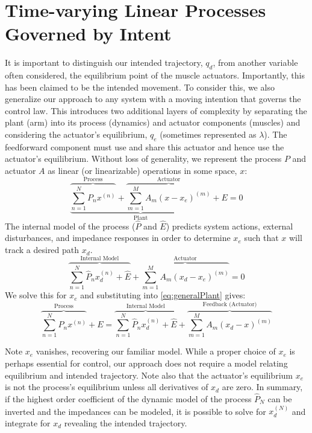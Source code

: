 \documentclass[10pt]{article}
\begin{document}
\section*{Time-varying Linear Processes Governed by Intent}
It is important to distinguish our intended trajectory, $q_d$, from another variable often considered, the equilibrium point of the muscle actuators. Importantly, this has been claimed to be the intended movement. To consider this, we also generalize our approach to any system with a moving intention that governs the control law. This introduces two additional layers of complexity by separating the plant (arm) into its process (dynamics) and actuator components (muscles) and considering the actuator's equilibrium, $q_e$ (sometimes represented as $\lambda$). The feedforward component must use and share this actuator and hence use the actuator's equilibrium. Without loss of generality, we represent the process $P$ and actuator $A$ as linear (or linearizable) operations in some space, $x$:
\begin{equation} \label{eq:generalPlant}
\underbrace{\overbrace{\sum_{n=1}^N P_nx^{(n)}}^\text{Process}+\overbrace{\sum_{m=1}^M A_m(x-x_e)^{(m)}}^\text{Actuator}}_\text{Plant}+E=0
\end{equation}
The internal model of the process ($\hat{P}$ and $\hat{E}$) predicts system actions, external disturbances, and impedance responses in order to determine $x_e$ such that $x$ will track a desired path $x_d$.    
\begin{equation}
\overbrace{\sum_{n=1}^N \hat{P}_n x^{(n)}_d+\hat{E}}^\text{Internal Model}+\overbrace{\sum_{m=1}^M A_m(x_d-x_e)^{(m)}}^\text{Actuator}=0
\end{equation}
We solve this for $x_e$ and substituting into \eqref{eq:generalPlant} gives:
\begin{equation}
\overbrace{\sum_{n=1}^N P_nx^{(n)}}^\text{Process}+E=\overbrace{\sum_{n=1}^N \hat{P}_n x^{(n)}_d+\hat{E}}^\text{Internal Model}+\overbrace{\sum_{m=1}^M A_m (x_d-x)^{(m)}}^\text{Feedback (Actuator)}
\end{equation}

Note $x_e$ vanishes, recovering our familiar model. While a proper choice of $x_e$ is perhaps essential for control, our approach does not require a model relating equilibrium and intended trajectory. Note also that the actuator's equilibrium $x_e$ is not the process's equilibrium unless all derivatives of $x_d$ are zero. In summary, if the highest order coefficient of the dynamic model of the process $\hat{P}_N$ can be inverted and the impedances can be modeled, it is possible to solve for $x_d^{(N)}$ and integrate for $x_d$ revealing the intended trajectory.
\end{document}

